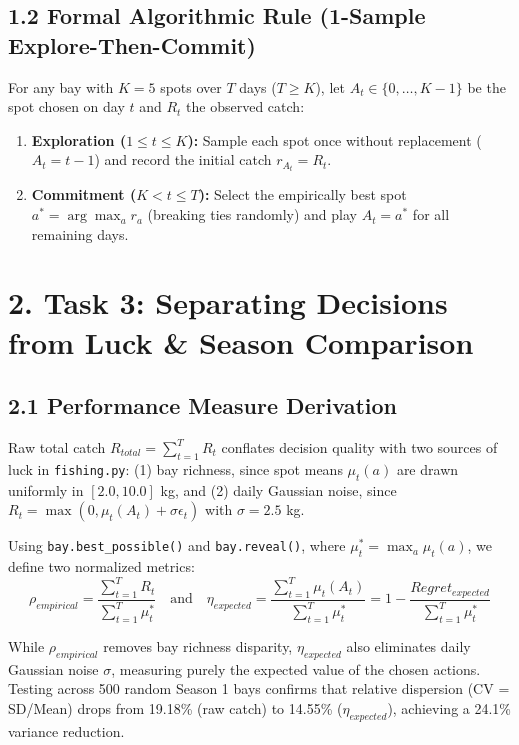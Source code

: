 \documentclass[11pt, a4paper]{article}
\begin{document}
\subsection*{1.2 Formal Algorithmic Rule (1-Sample Explore-Then-Commit)}
For any bay with $K=5$ spots over $T$ days ($T \ge K$), let $A_t \in \{0, \dots, K-1\}$ be the spot chosen on day $t$ and $R_t$ the observed catch:
\begin{enumerate}
    \item \textbf{Exploration ($1 \le t \le K$):} Sample each spot once without replacement ($A_t = t-1$) and record the initial catch $r_{A_t} = R_t$.
    \item \textbf{Commitment ($K < t \le T$):} Select the empirically best spot $a^* = \arg\max_a r_a$ (breaking ties randomly) and play $A_t = a^*$ for all remaining days.
\end{enumerate}

\section*{2. Task 3: Separating Decisions from Luck \& Season Comparison}

\subsection*{2.1 Performance Measure Derivation}
Raw total catch $R_{total} = \sum_{t=1}^T R_t$ conflates decision quality with two sources of luck in \texttt{fishing.py}: (1) bay richness, since spot means $\mu_t(a)$ are drawn uniformly in $[2.0, 10.0]$ kg, and (2) daily Gaussian noise, since $R_t = \max(0, \mu_t(A_t) + \sigma\epsilon_t)$ with $\sigma=2.5$ kg. 

Using \texttt{bay.best\_possible()} and \texttt{bay.reveal()}, where $\mu_t^* = \max_a \mu_t(a)$, we define two normalized metrics:
\begin{equation}
    \rho_{empirical} = \frac{\sum_{t=1}^T R_t}{\sum_{t=1}^T \mu_t^*} \quad \text{and} \quad \eta_{expected} = \frac{\sum_{t=1}^T \mu_t(A_t)}{\sum_{t=1}^T \mu_t^*} = 1 - \frac{Regret_{expected}}{\sum_{t=1}^T \mu_t^*}
\end{equation}

While $\rho_{empirical}$ removes bay richness disparity, $\eta_{expected}$ also eliminates daily Gaussian noise $\sigma$, measuring purely the expected value of the chosen actions. Testing across 500 random Season 1 bays confirms that relative dispersion (CV = SD/Mean) drops from 19.18\% (raw catch) to 14.55\% ($\eta_{expected}$), achieving a 24.1\% variance reduction.
\end{document}
